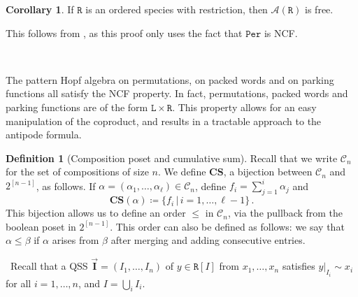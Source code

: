 \documentclass[12pt, reqno]{amsart}
\theoremstyle{definition}
\newtheorem{cor}[thm]{Corollary}
\newtheorem{defin}[thm]{Definition}
\newcommand{\III}{\vec{\mathbf{I}}}
\begin{document}
\begin{cor}\label{cor:freeNCF}
If $\mathtt{R}$ is an ordered species with restriction, then $\mathcal A(\mathtt{R})$ is free.
\end{cor}
This follows from \cite[Theorem 5.2]{Vargas}, as this proof only uses the fact that $\mathtt{Per}$ is NCF.

\

The pattern Hopf algebra on permutations, on packed words and on parking functions all satisfy the NCF property.
In fact, permutations, packed words and parking functions are of the form $\mathtt{L} \times \mathtt{R}$.
This property allows for an easy manipulation of the coproduct, and results in a tractable approach to the antipode formula.

\begin{defin}[Composition poset and cumulative sum]
Recall that we write $\mathcal C_n$ for the set of compositions of size $n$.
We define $\mathbf{CS}$, a bijection between $\mathcal C_n $ and $2^{[n-1]}$, as follows.
If $\alpha =(\alpha_1, \dots, \alpha_{\ell} ) \in \mathcal C_n$, define $f_i = \sum_{j=1}^i \alpha_j$ and 
\begin{equation}
    \mathbf{CS}(\alpha) \coloneqq \{f_i\, | \, i = 1, \dots, \ell - 1\} \, .
\end{equation}
This bijection allows us to define an order $\leq $ in $\mathcal C_n$, via the pullback from the boolean poset in $2^{[n-1]}$.
This order can also be defined as follows: we say that $\alpha \leq \beta$ if $\alpha$ arises from $\beta $ after merging and adding consecutive entries.
\end{defin}

\
Recall that a QSS $\III = (I_1, \dots , I_n)$ of $y\in \mathtt{R}[I]$ from $x_1, \dots, x_n$ satisfies $y|_{I_i} \sim x_i$ for all $i = 1, \dots , n$, and $I = \bigcup_i I_i$.
\end{document}
